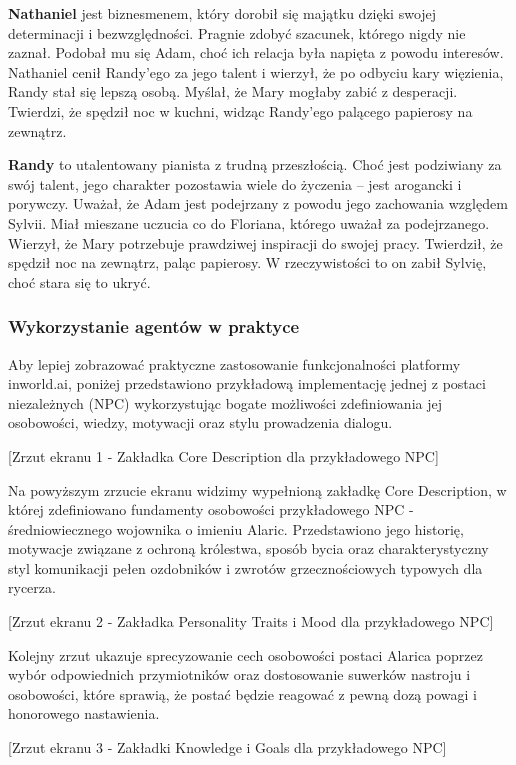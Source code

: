 \textbf{Nathaniel} jest biznesmenem, który dorobił się majątku dzięki swojej determinacji i bezwzględności.
Pragnie zdobyć szacunek, którego nigdy nie zaznał. Podobał mu się Adam, choć ich relacja była
napięta z powodu interesów. Nathaniel cenił Randy'ego za jego talent i wierzył, że po odbyciu kary
więzienia, Randy stał się lepszą osobą. Myślał, że Mary mogłaby zabić z desperacji. Twierdzi, że
spędził noc w kuchni, widząc Randy'ego palącego papierosy na zewnątrz.

\textbf{Randy} to utalentowany pianista z trudną przeszłością. Choć jest podziwiany za swój talent, jego
charakter pozostawia wiele do życzenia – jest arogancki i porywczy. Uważał, że Adam jest podejrzany
z powodu jego zachowania względem Sylvii. Miał mieszane uczucia co do Floriana, którego uważał za
podejrzanego. Wierzył, że Mary potrzebuje prawdziwej inspiracji do swojej pracy. Twierdził, że
spędził noc na zewnątrz, paląc papierosy. W rzeczywistości to on zabił Sylvię, choć stara się to
ukryć.

\subsubsection*{Wykorzystanie agentów w praktyce}

Aby lepiej zobrazować praktyczne zastosowanie funkcjonalności platformy inworld.ai, poniżej
przedstawiono przykładową implementację jednej z postaci niezależnych (NPC) wykorzystując bogate
możliwości zdefiniowania jej osobowości, wiedzy, motywacji oraz stylu prowadzenia dialogu.

    [Zrzut ekranu 1 - Zakładka Core Description dla przykładowego NPC]

Na powyższym zrzucie ekranu widzimy wypełnioną zakładkę Core Description, w której zdefiniowano
fundamenty osobowości przykładowego NPC - średniowiecznego wojownika o imieniu Alaric. Przedstawiono
jego historię, motywacje związane z ochroną królestwa, sposób bycia oraz charakterystyczny styl
komunikacji pełen ozdobników i zwrotów grzecznościowych typowych dla rycerza.

    [Zrzut ekranu 2 - Zakładka Personality Traits i Mood dla przykładowego NPC]

Kolejny zrzut ukazuje sprecyzowanie cech osobowości postaci Alarica poprzez wybór odpowiednich
przymiotników oraz dostosowanie suwerków nastroju i osobowości, które sprawią, że postać będzie
reagować z pewną dozą powagi i honorowego nastawienia.

    [Zrzut ekranu 3 - Zakładki Knowledge i Goals dla przykładowego NPC]

